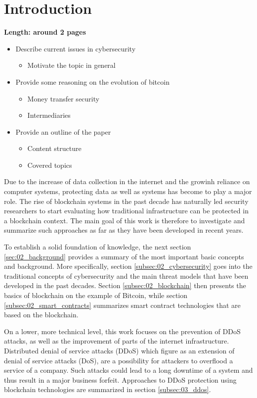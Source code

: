 \section{Introduction}

\textbf{Length: around 2 pages}

\begin{itemize}
  \item Describe current issues in cybersecurity
  \begin{itemize}
    \item Motivate the topic in general
  \end{itemize}
  \item Provide some reasoning on the evolution of bitcoin
  \begin{itemize}
    \item Money transfer security
    \item Intermediaries
  \end{itemize}
  \item Provide an outline of the paper
  \begin{itemize}
    \item Content structure
    \item Covered topics
  \end{itemize}
\end{itemize}

Due to the increase of data collection in the internet and the growinh reliance on computer systems, protecting data as well as systems has become to play a major role. The rise of blockchain systems in the past decade has naturally led security researchers to start evaluating how traditional infrastructure can be protected in a blockchain context. The main goal of this work is therefore to investigate and summarize such approaches as far as they have been developed in recent years.

To establish a solid foundation of knowledge, the next section \ref{sec:02_background} provides a summary of the most important basic concepts and background. More specifically, section \ref{subsec:02_cybersecurity} goes into the traditional concepts of cybersecurity and the main threat models that have been developed in the past decades. Section \ref{subsec:02_blockchain} then presents the basics of blockchain on the example of Bitcoin, while section \ref{subsec:02_smart_contracts} summarizes smart contract technologies that are based on the blockchain.

On a lower, more technical level, this work focuses on the prevention of DDoS attacks, as well as the improvement of parts of the internet infrastructure. Distributed denial of service attacks (DDoS) which figure as an extension of denial of service attacks (DoS), are a possibility for attackers to overflood a service of a company. Such attacks could lead to a long downtime of a system and thus result in a major business forfeit. Approaches to DDoS protection using blockchain technologies are summarized in section \ref{subsec:03_ddos}.

